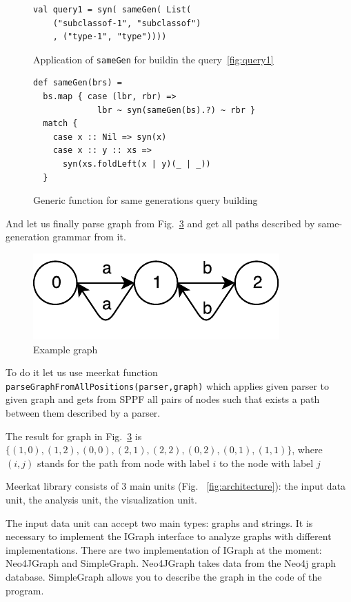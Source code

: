 \begin{figure}[h]
\begin{lstlisting}
val query1 = syn( sameGen( List(
    ("subclassof-1", "subclassof")
    , ("type-1", "type"))))
\end{lstlisting}
\caption{Application of \lstinline{sameGen} for buildin the query~\ref{fig:query1}}
\label{fig:query1Gen}
\end{figure}

\begin{figure}[h]
\begin{lstlisting}
def sameGen(brs) =
  bs.map { case (lbr, rbr) => 
             lbr ~ syn(sameGen(bs).?) ~ rbr } 
  match {
    case x :: Nil => syn(x)
    case x :: y :: xs => 
      syn(xs.foldLeft(x | y)(_ | _))
  }
\end{lstlisting}
\caption{Generic function for same generations query building}
\label{fig:gen}
\end{figure}

And let us finally parse graph from Fig.~\ref{fig:graph} and get all paths described by same-generation grammar from it.

\begin{figure}[h]
\includegraphics{graph}
\caption{Example graph}
\label{fig:graph}
\end{figure}

To do it let us use meerkat function \lstinline{parseGraphFromAllPositions(parser,graph)} which applies given parser to given graph and gets from SPPF all pairs of nodes such that exists a path between them described by a parser.

The result for graph in Fig.~\ref{fig:graph} is $\{(1,0), (1,2), (0,0), (2,1), (2,2), (0,2), (0,1), (1,1)\}$, where $(i,j)$ stands for the path from node with label $i$ to the node with label $j$

Meerkat library consists of 3 main units (Fig. ~\ref{fig:architecture}): the input data unit, the analysis unit, the visualization unit.

The input data unit can accept two main types: graphs and strings. It is necessary to implement the IGraph interface to analyze graphs with different implementations. There are two implementation of IGraph at the moment: Neo4JGraph and SimpleGraph. Neo4JGraph takes data from the Neo4j graph database. SimpleGraph allows you to describe the graph in the code of the program.

